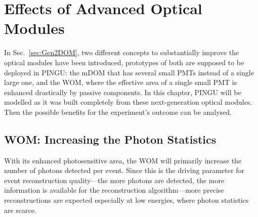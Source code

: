 \section{Effects of Advanced Optical Modules}
\label{sec:om_effects}

In Sec.~\ref{sec:Gen2DOM}, two different concepts to substantially improve the 
optical modules have been introduced, prototypes of both are supposed to be 
deployed in PINGU: the mDOM that has several small PMTs instead of a single 
large one, and the WOM, where the effective area of a single small PMT is 
enhanced drastically by passive components. In this chapter, PINGU will be
modelled as it was built completely from these next-generation optical modules. 
Then the possible benefits for the experiment's outcome can be analysed.

\subsection{WOM: Increasing the Photon Statistics}
\label{sec:wom_effect}

With its enhanced photosensitive area, the WOM will primarily increase the
number of photons detected per event. Since this is the driving parameter for
event reconstruction quality---the more photons are detected, the more
information is available for the reconstruction algorithm---more precise
reconstructions are expected especially at low energies, where photon
statistics are scarce.


